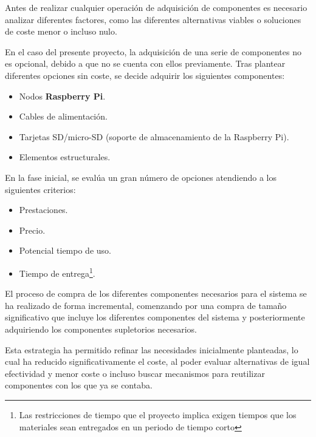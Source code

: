 Antes de realizar cualquier operación de adquisición de componentes es necesario analizar diferentes factores, como las diferentes alternativas viables o soluciones de coste menor o incluso nulo.

En el caso del presente proyecto, la adquisición de una serie de componentes no es opcional, debido a que no se cuenta con ellos previamente. Tras plantear diferentes opciones sin coste, se decide adquirir los siguientes componentes:

\begin{itemize}
	\item Nodos \textbf{Raspberry Pi}.
	\item Cables de alimentación.
	\item Tarjetas SD/micro-SD (soporte de almacenamiento de la Raspberry Pi).
	\item Elementos estructurales.
\end{itemize}

En la fase inicial, se evalúa un gran número de opciones atendiendo a los siguientes criterios:

\begin{itemize}
	\item Prestaciones.
	\item Precio.
	\item Potencial tiempo de uso.
	\item Tiempo de entrega\footnote{Las restricciones de tiempo que el proyecto implica exigen tiempos que los materiales sean entregados en un periodo de tiempo corto}.
\end{itemize}

\citationneeded[TODO]
El proceso de compra de los diferentes componentes necesarios para el sistema se ha realizado de forma incremental, comenzando por una compra de tamaño significativo que incluye los diferentes componentes del sistema y posteriormente adquiriendo los componentes supletorios necesarios.

Esta estrategia ha permitido refinar las necesidades inicialmente planteadas, lo cual ha reducido significativamente el coste, al poder evaluar alternativas de igual efectividad y menor coste o incluso buscar mecanismos para reutilizar componentes con los que ya se contaba.

